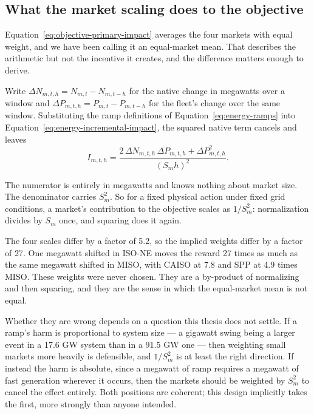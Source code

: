 ﻿\documentclass[12pt]{article}
\begin{document}
\subsection{What the market scaling does to the objective}
\label{subsec:objective-market-weighting}

Equation~\eqref{eq:objective-primary-impact} averages the four markets with
equal weight, and we have been calling it an equal-market mean. That
describes the arithmetic but not the incentive it creates, and the difference
matters enough to derive.

Write \(\Delta N_{m,t,h}=N_{m,t}-N_{m,t-h}\) for the native change in megawatts
over a window and \(\Delta P_{m,t,h}=P_{m,t}-P_{m,t-h}\) for the fleet's change
over the same window. Substituting the ramp definitions of
Equation~\eqref{eq:energy-ramps} into
Equation~\eqref{eq:energy-incremental-impact}, the squared native term cancels
and leaves
\begin{equation}
  I_{m,t,h}
  =
  \frac{2\,\Delta N_{m,t,h}\,\Delta P_{m,t,h}+\Delta P_{m,t,h}^{2}}
       {\left(S_m h\right)^{2}}.
  \label{eq:objective-scale-sensitivity}
\end{equation}

The numerator is entirely in megawatts and knows nothing about market size. The
denominator carries \(S_m^{2}\). So for a fixed physical action under fixed grid
conditions, a market's contribution to the objective scales as \(1/S_m^{2}\):
normalization divides by \(S_m\) once, and squaring does it again.

The four scales differ by a factor of 5.2, so the implied weights differ by a
factor of 27. One megawatt shifted in ISO-NE moves the reward 27 times as much
as the same megawatt shifted in MISO, with CAISO at 7.8 and SPP at 4.9 times
MISO. These weights were never chosen. They are a by-product of normalizing and
then squaring, and they are the sense in which the equal-market mean is not
equal.

Whether they are wrong depends on a question this thesis does not settle. If a
ramp's harm is proportional to system size --- a gigawatt swing being a larger
event in a 17.6 GW system than in a 91.5 GW one --- then weighting small markets
more heavily is defensible, and \(1/S_m^{2}\) is at least the right direction. If
instead the harm is absolute, since a megawatt of ramp requires a megawatt of
fast generation wherever it occurs, then the markets should be weighted by
\(S_m^{2}\) to cancel the effect entirely. Both positions are coherent; this
design implicitly takes the first, more strongly than anyone intended.
\end{document}
